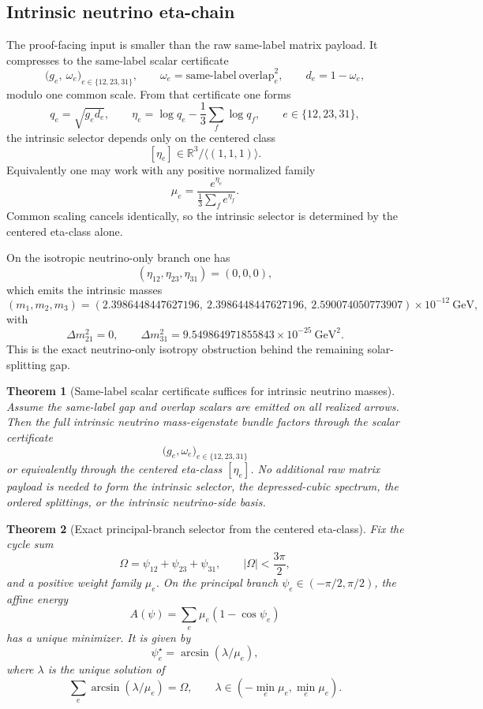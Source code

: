 \documentclass[11pt]{article}
\newtheorem{theorem}{Theorem}[section]
\begin{document}
\subsection{Intrinsic neutrino eta-chain}

The proof-facing input is smaller than the raw same-label matrix payload. It compresses to the
same-label scalar certificate
\[
\bigl(g_e,\ \omega_e\bigr)_{e\in\{12,23,31\}},
\qquad
\omega_e=\mathrm{same\text{-}label\ overlap}_e^2,
\qquad
d_e=1-\omega_e,
\]
modulo one common scale. From that certificate one forms
\[
q_e=\sqrt{g_e d_e},
\qquad
\eta_e=\log q_e-\frac13\sum_f \log q_f,
\qquad
e\in\{12,23,31\},
\]
the intrinsic selector depends only on the centered class
\[
[\eta_e]\in \mathbb{R}^3/\langle(1,1,1)\rangle.
\]
Equivalently one may work with any positive normalized family
\[
\mu_e=\frac{e^{\eta_e}}{\frac13\sum_f e^{\eta_f}}.
\]
Common scaling cancels identically, so the intrinsic selector is determined by the centered
eta-class alone.

On the isotropic neutrino-only branch one has
\[
(\eta_{12},\eta_{23},\eta_{31})=(0,0,0),
\]
which emits the intrinsic masses
\[
(m_1,m_2,m_3)=
(2.3986448447627196,\ 2.3986448447627196,\ 2.590074050773907)\times10^{-12}\ \mathrm{GeV},
\]
with
\[
\Delta m_{21}^2=0,
\qquad
\Delta m_{31}^2=9.549864971855843\times10^{-25}\ \mathrm{GeV}^2.
\]
This is the exact neutrino-only isotropy obstruction behind the remaining solar-splitting gap.

\begin{theorem}[Same-label scalar certificate suffices for intrinsic neutrino masses]
Assume the same-label gap and overlap scalars are emitted on all realized arrows. Then the full
intrinsic neutrino mass-eigenstate bundle factors through the scalar certificate
\[
\bigl(g_e,\omega_e\bigr)_{e\in\{12,23,31\}}
\]
or equivalently through the centered eta-class \([\eta_e]\). No additional raw matrix payload is
needed to form the intrinsic selector, the depressed-cubic spectrum, the ordered splittings, or
the intrinsic neutrino-side basis.
\end{theorem}

\begin{theorem}[Exact principal-branch selector from the centered eta-class]
Fix the cycle sum
\[
\Omega=\psi_{12}+\psi_{23}+\psi_{31},
\qquad |\Omega|<\frac{3\pi}{2},
\]
and a positive weight family \(\mu_e\). On the principal branch
\(\psi_e\in(-\pi/2,\pi/2)\), the affine energy
\[
A(\psi)=\sum_e \mu_e(1-\cos\psi_e)
\]
has a unique minimizer. It is given by
\[
\psi_e^\star=\arcsin(\lambda/\mu_e),
\]
where \(\lambda\) is the unique solution of
\[
\sum_e \arcsin(\lambda/\mu_e)=\Omega,
\qquad
\lambda\in(-\min_e\mu_e,\min_e\mu_e).
\]
\end{theorem}
\end{document}
